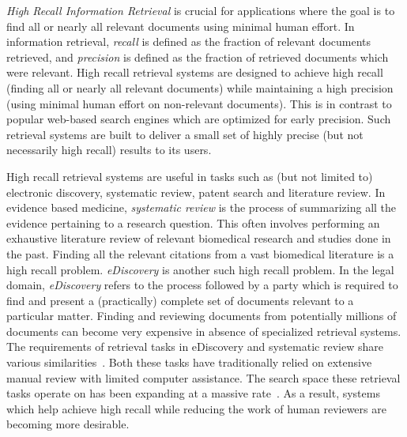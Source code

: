 \textit{High Recall Information Retrieval} is crucial for applications where the
goal is to find all or nearly all relevant documents using minimal human effort.
In information retrieval, \textit{recall} is defined as the fraction of relevant
documents retrieved, and \textit{precision} is defined as the fraction of
retrieved documents which were relevant. High recall retrieval systems are
designed to achieve high recall (finding all or nearly all relevant documents)
while maintaining a high precision (using minimal human effort on non-relevant
documents). This is in contrast to popular web-based search engines which are
optimized for early precision. Such retrieval systems are built to deliver a
small set of highly precise (but not necessarily high recall) results to its
users.

High recall retrieval systems are useful in tasks such as (but not limited to)
electronic discovery, systematic review, patent search and literature review. In
evidence based medicine, \textit{systematic review} is the process of summarizing all the evidence
pertaining to a research question. This often involves performing an exhaustive
literature review of relevant biomedical research and studies done in the past.
Finding all the relevant citations from a vast biomedical literature is a high
recall problem. \textit{eDiscovery} is another such high recall problem. In the
legal domain, \textit{eDiscovery} refers to the process followed by a party
which is required to find and present a (practically) complete set of documents
relevant to a particular matter.  Finding and reviewing documents from
potentially millions of documents can become very expensive in absence of
specialized retrieval systems. The requirements of
retrieval tasks in eDiscovery and systematic review share various
similarities~\cite{lease2016systematic,oard2013information}. Both
these tasks have traditionally relied on extensive manual review with limited computer
assistance. The search space these retrieval tasks operate on has been expanding
at a massive rate~\cite{bastian2010seventy,paul2006information}. As a result, systems
which help achieve high recall while reducing the work of human reviewers are
becoming more desirable.


